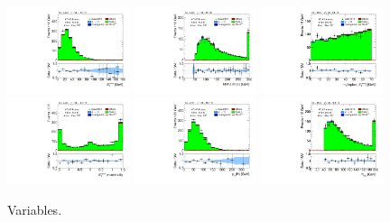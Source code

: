 \begin{figure}[tp]
  \includegraphics[width=0.32\textwidth]{figures/analysis/vbf-SSXCR/met-pt-hi}
  \includegraphics[width=0.32\textwidth]{figures/analysis/vbf-SSXCR/mMMC}
  \includegraphics[width=0.32\textwidth]{figures/analysis/vbf-SSXCR/mT}
  \includegraphics[width=0.32\textwidth]{figures/analysis/vbf-SSXCR/met-phi-centrality}
  \includegraphics[width=0.32\textwidth]{figures/analysis/vbf-SSXCR/H-pt-hi}
  \includegraphics[width=0.32\textwidth]{figures/analysis/vbf-SSXCR/mvis}
  \caption{Variables.}
  \label{fig:backgrounds-SSXCR-taus}
\end{figure}

